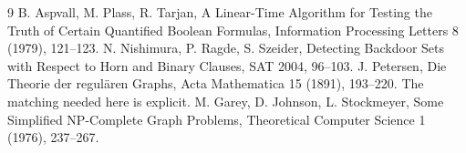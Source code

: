 \documentclass[11pt]{article}
\begin{document}
\begin{thebibliography}{9}
 B. Aspvall, M. Plass, R. Tarjan, A Linear-Time Algorithm for Testing the Truth of Certain Quantified Boolean Formulas, Information Processing Letters 8 (1979), 121--123.
 N. Nishimura, P. Ragde, S. Szeider, Detecting Backdoor Sets with Respect to Horn and Binary Clauses, SAT 2004, 96--103.
 J. Petersen, Die Theorie der regul\"aren Graphs, Acta Mathematica 15 (1891), 193--220. The matching needed here is explicit.
 M. Garey, D. Johnson, L. Stockmeyer, Some Simplified NP-Complete Graph Problems, Theoretical Computer Science 1 (1976), 237--267.
\end{thebibliography}
\end{document}
